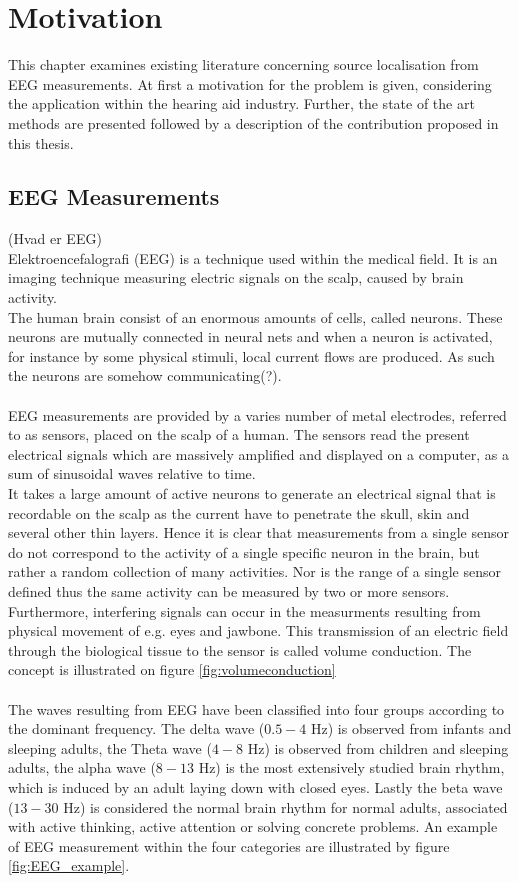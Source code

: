 \chapter{Motivation}
This chapter examines existing literature concerning source localisation from EEG measurements. At first a motivation for the problem is given, considering the application within the hearing aid industry. Further, the state of the art methods are presented followed by a description of the contribution proposed in this thesis. 

\section{EEG Measurements}
(Hvad er EEG)\\
Elektroencefalografi (EEG) is a technique used within the medical field. It is an imaging technique measuring electric signals on the scalp, caused by brain activity. \\
The human brain consist of an enormous amounts of cells, called neurons. These neurons are mutually connected in neural nets and when a neuron is activated, for instance by some physical stimuli, local current flows are produced\cite{fundamentalEEG}. As such the neurons are somehow communicating(?). \\
\\
EEG measurements are provided by a varies number of metal electrodes, referred to as sensors, placed on the scalp of a human. The sensors read the present electrical signals which are massively amplified and displayed on a computer, as a sum of sinusoidal waves relative to time.\\
It takes a large amount of active neurons to generate an electrical signal that is recordable on the scalp as the current have to penetrate the skull, skin and several other thin layers.
Hence it is clear that measurements from a single sensor do not correspond to the activity of a single specific neuron in the brain, but rather a random collection of many activities. Nor is the range of a single sensor defined thus the same activity can be measured by two or more sensors. Furthermore, interfering signals can occur in the measurments resulting from physical movement of e.g. eyes and jawbone\cite{fundamentalEEG}. This transmission of an electric field through the biological tissue to the sensor is called volume conduction. The concept is illustrated on figure \ref{fig:volumeconduction}\\
\\
The waves resulting from EEG have been classified into four groups according to the dominant frequency. The delta wave ($0.5-4$ Hz) is observed from infants and sleeping adults, the Theta wave ($4-8$ Hz) is observed from children and sleeping adults, the alpha wave ($8-13$ Hz) is the most extensively studied brain rhythm, which is induced by an adult laying down with closed eyes. Lastly the beta wave ($13-30$ Hz) is considered the normal brain rhythm for normal adults, associated with active thinking, active attention or solving concrete problems\cite[p. 11]{EEGsignalprocessing}. An example of EEG measurement within the four categories are illustrated 
by figure \ref{fig:EEG_example}.        

